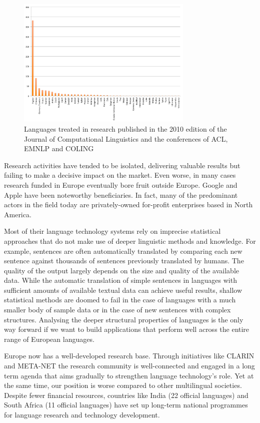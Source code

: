 \documentclass[10pt, plain]{../../metanetpaper}
\begin{document}
\begin{multicols}{2}
\begin{figure}[htb]
  \center
  \includegraphics[width=0.75\textwidth]{../_media/Languages-in-LT-Research}
  \caption{Languages treated in research published in the 2010 edition of the Journal of Computational Linguistics and the conferences of ACL, EMNLP and COLING}
  \label{fig:languages-in-research}
\end{figure}

Research activities have tended to be isolated, delivering valuable results but failing to make a decisive impact on the market. Even worse, in many cases research funded in Europe eventually bore fruit outside Europe. Google and Apple have been noteworthy beneficiaries. In fact, many of the predominant actors in the field today are privately-owned for-profit enterprises based in North America.

Most of their language technology systems rely on imprecise statistical approaches that do not make use of deeper linguistic methods and knowledge. For example, sentences are often automatically translated by comparing each new sentence against thousands of sentences previously translated by humans. The quality of the output largely depends on the size and quality of the available data. While the automatic translation of simple sentences in languages with sufficient amounts of available textual data can achieve useful results, shallow statistical methods are doomed to fail in the case of languages with a much smaller body of sample data or in the case of new sentences with complex structures. Analysing the deeper structural properties of languages is the only way forward if we want to build applications that perform well across the entire range of European languages.

Europe now has a well-developed research base. Through initiatives like CLARIN and META-NET the research community is well-connected and engaged in a long term agenda that aims gradually to strengthen language technology's role. Yet at the same time, our position is worse compared to other multilingual societies. Despite fewer financial resources, countries like India (22 official languages) and South Africa (11 official languages) have set up long-term national programmes for language research and technology development.


\end{multicols}
\end{document}
